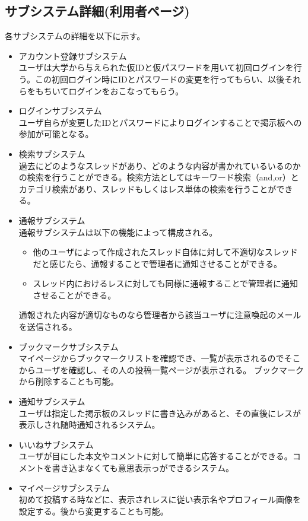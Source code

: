 \documentclass[a4j]{jarticle}
\begin{document}
\subsection{サブシステム詳細(利用者ページ)}
各サブシステムの詳細を以下に示す。
\begin{itemize}
\item アカウント登録サブシステム\\
ユーザは大学から与えられた仮IDと仮パスワードを用いて初回ログインを行う。この初回ログイン時にIDとパスワードの変更を行ってもらい、以後それらをもちいてログインをおこなってもらう。

\item ログインサブシステム\\
ユーザ自らが変更したIDとパスワードによりログインすることで掲示板への参加が可能となる。

\item 検索サブシステム\\
過去にどのようなスレッドがあり、どのような内容が書かれているいるのかの検索を行うことができる。検索方法としてはキーワード検索（and,or）とカテゴリ検索があり、スレッドもしくはレス単体の検索を行うことができる。

\item 通報サブシステム\\
通報サブシステムは以下の機能によって構成される。

\begin{itemize}
\item 他のユーザによって作成されたスレッド自体に対して不適切なスレッドだと感じたら、通報することで管理者に通知させることができる。
\item スレッド内におけるレスに対しても同様に通報することで管理者に通知させることができる。\\
\end{itemize}
通報された内容が適切なものなら管理者から該当ユーザに注意喚起のメールを送信される。

\item ブックマークサブシステム\\
マイページからブックマークリストを確認でき、一覧が表示されるのでそこからユーザを確認し、その人の投稿一覧ページが表示される。
ブックマークから削除することも可能。

\item 通知サブシステム\\
ユーザは指定した掲示板のスレッドに書き込みがあると、その直後にレスが表示しされ随時通知されるシステム。

\item いいねサブシステム\\
ユーザが目にした本文やコメントに対して簡単に応答することができる。コメントを書き込まなくても意思表示っができるシステム。

\item マイページサブシステム\\
初めて投稿する時などに、表示されレスに従い表示名やプロフィール画像を設定する。後から変更することも可能。
\end{itemize}
\end{document}
